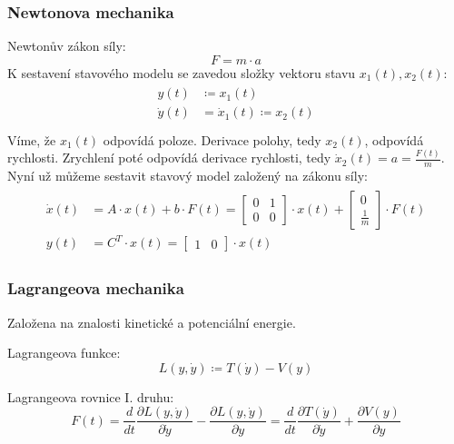 \subsubsection*{Newtonova mechanika}
Newtonův zákon síly:
\begin{equation}
\boxed{F = m \cdot a}
\end{equation}
K sestavení stavového modelu se zavedou složky vektoru stavu $ x_1(t), x_2(t) $:
\begin{align}
\begin{split}
y(t) &\coloneqq x_1(t) \\
\dot{y}(t) &= \dot{x}_1(t) \coloneqq x_2(t) \\
\end{split}
\end{align}
Víme, že $ x_1(t) $ odpovídá poloze. Derivace polohy, tedy $ x_2(t) $, odpovídá rychlosti. Zrychlení poté odpovídá derivace rychlosti, tedy $ \dot{x}_2(t) = a = \frac{F(t)}{m} $. Nyní už můžeme sestavit stavový model založený na zákonu síly:
\begin{align}
\begin{split}
\dot{x}(t) &= A \cdot x(t) + b \cdot F(t) = \begin{bmatrix}
0 & 1 \\ 0 & 0
\end{bmatrix} \cdot x(t) + \begin{bmatrix}
0 \\ \frac{1}{m}
\end{bmatrix} \cdot F(t) \\
y(t) &= C^T \cdot x(t) = \begin{bmatrix}
1 & 0
\end{bmatrix} \cdot x(t)
\end{split}
\end{align}

\subsubsection*{Lagrangeova mechanika}
Založena na znalosti kinetické a potenciální energie.

Lagrangeova funkce:
\begin{equation}
L(y, \dot{y}) \coloneqq T(\dot{y}) - V(y)
\end{equation}

Lagrangeova rovnice I. druhu:
\begin{equation}
F(t) = \frac{d}{dt} \frac{\partial L(y, \dot{y})}{\partial \dot{y}} - \frac{\partial L(y, \dot{y})}{\partial y} = \frac{d}{dt} \frac{\partial T(\dot{y})}{\partial \dot{y}} + \frac{\partial V(y)}{\partial y}
\end{equation}

